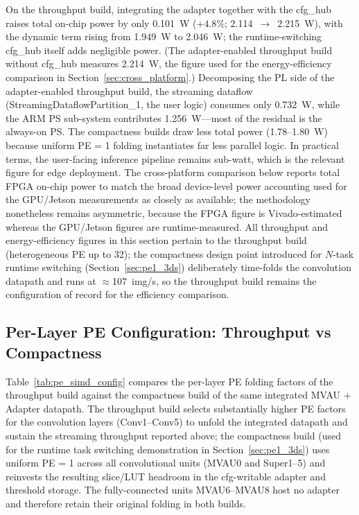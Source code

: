 \documentclass[12pt, a4paper]{report}
\numberwithin{equation}{chapter}
\numberwithin{figure}{chapter}
\numberwithin{table}{chapter}
\numberwithin{algorithm}{chapter}
\begin{document}
On the throughput build, integrating the adapter together with the cfg\_hub raises total on-chip power by only 0.101~W ($+4.8\%$; 2.114~$\to$~2.215~W), with the dynamic term rising from 1.949~W to 2.046~W; the runtime-switching cfg\_hub itself adds negligible power. (The adapter-enabled throughput build without cfg\_hub measures 2.214~W, the figure used for the energy-efficiency comparison in Section~\ref{sec:cross_platform}.) Decomposing the PL side of the adapter-enabled throughput build, the streaming dataflow (StreamingDataflowPartition\_1, the user logic) consumes only 0.732~W, while the ARM PS sub-system contributes 1.256~W---most of the residual is the always-on PS. The compactness builds draw less total power (1.78--1.80~W) because uniform PE = 1 folding instantiates far less parallel logic. In practical terms, the user-facing inference pipeline remains sub-watt, which is the relevant figure for edge deployment. The cross-platform comparison below reports total FPGA on-chip power to match the broad device-level power accounting used for the GPU/Jetson measurements as closely as available; the methodology nonetheless remains asymmetric, because the FPGA figure is Vivado-estimated whereas the GPU/Jetson figures are runtime-measured. All throughput and energy-efficiency figures in this section pertain to the throughput build (heterogeneous PE up to 32); the compactness design point introduced for $N$-task runtime switching (Section~\ref{sec:pe1_3ds}) deliberately time-folds the convolution datapath and runs at $\approx$107~img/s, so the throughput build remains the configuration of record for the efficiency comparison.

\subsection{Per-Layer PE Configuration: Throughput vs Compactness}
\label{sec:pe_simd_breakdown}

Table~\ref{tab:pe_simd_config} compares the per-layer PE folding factors of the throughput build against the compactness build of the same integrated MVAU + Adapter datapath. The throughput build selects substantially higher PE factors for the convolution layers (Conv1--Conv5) to unfold the integrated datapath and sustain the streaming throughput reported above; the compactness build (used for the runtime task switching demonstration in Section~\ref{sec:pe1_3ds}) uses uniform PE = 1 across all convolutional units (MVAU0 and Super1--5) and reinvests the resulting slice/LUT headroom in the cfg-writable adapter and threshold storage. The fully-connected units MVAU6--MVAU8 host no adapter and therefore retain their original folding in both builds.
\end{document}

